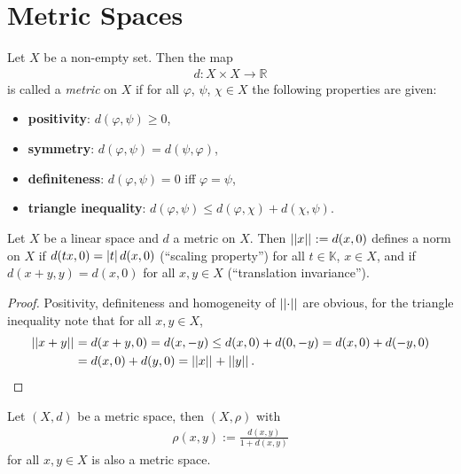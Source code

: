 \section{Metric Spaces}
\begin{defn}\label{defn:metric_space}
	Let $X$ be a non-empty set. Then the map 
	\begin{align*}
		d: X\times X\rightarrow \mathbb R
	\end{align*}
	is called a \textit{metric} on $X$ if for all $\varphi$, $\psi$, $\chi\in X$ the following properties are given: 
	\begin{itemize}
		\item \textbf{positivity}: $d(\varphi, \psi) \geq 0$, 
		\item \textbf{symmetry}: $d(\varphi, \psi) = d(\psi, \varphi)$, 
		\item \textbf{definiteness}: $d(\varphi, \psi) = 0$ iff $\varphi = \psi$, 
		\item \textbf{triangle inequality}: $d(\varphi, \psi) \leq d(\varphi, \chi) + d(\chi, \psi)$. 
	\end{itemize}
\end{defn}

\begin{theorem}
	Let $X$ be a linear space and $d$ a metric on $X$. Then $\left\vert\left\vert x \right\vert\right\vert_{} := d(x, 0)$ defines a norm on $X$ if $d(tx, 0) = \left\vert t \right\vert d(x, 0)$ (\enquote{scaling property}) for all $t\in\mathbb K$, $x\in X$, and if $d(x + y, y) = d(x, 0)$ for all $x, y\in X$ (\enquote{translation invariance}).
\end{theorem}

\begin{proof}
	Positivity, definiteness and homogeneity of $\left\vert\left\vert \cdot \right\vert\right\vert_{}$ are obvious, for the triangle inequality note that for all $x, y\in X$,
	\begin{align*}
		\left\vert\left\vert x + y \right\vert\right\vert_{} &= d(x + y, 0) = d(x, -y) \leq d(x, 0) + d(0, -y) = d(x, 0) + d(-y, 0) 
		\\ &= d(x, 0) + d(y, 0) = \left\vert\left\vert x \right\vert\right\vert_{} + \left\vert\left\vert y \right\vert\right\vert_{}.
	\end{align*}
\end{proof}

\begin{theorem}\label{thrm:new_metric_out_of_given_metric}
	Let $(X, d)$ be a metric space, then $(X, \rho)$ with 
	\begin{align}
		\rho(x, y) := \frac{d(x, y)}{1 + d(x, y)}
	\end{align}
	for all $x, y\in X$ is also a metric space.
\end{theorem}

